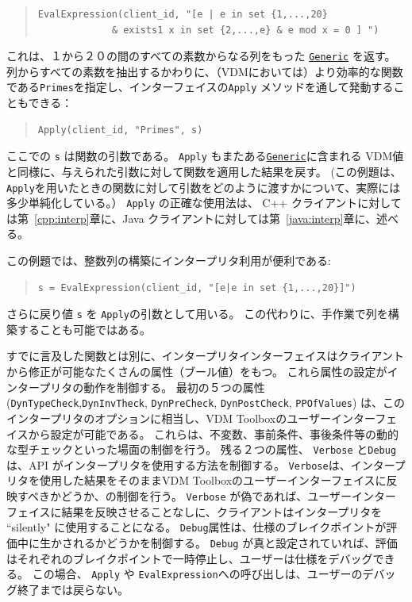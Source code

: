 \documentclass[\pformat,12pt]{jarticle}
\newcommand{\Generic}{\hyperlink{interface.Generic}{Generic}}
\begin{document}
\newpage
\begin{quote}
\begin{verbatim}    
EvalExpression(client_id, "[e | e in set {1,...,20} 
             & exists1 x in set {2,...,e} & e mod x = 0 ] ")
\end{verbatim}
\end{quote}

これは、１から２０の間のすべての素数からなる列をもった {\tt \Generic} を返す。列からすべての素数を抽出するかわりに、（VDMにおいては）より効率的な関数である{\tt Primes}を指定し、インターフェイスの{\tt Apply} メソッドを通して発動することもできる：

\begin{quote}
\begin{verbatim}    
Apply(client_id, "Primes", s)
\end{verbatim}
\end{quote}

ここでの {\tt s} は関数の引数である。
{\tt Apply} もまたある{\tt \Generic}に含まれる VDM値と同様に、与えられた引数に対して関数を適用した結果を戻す。
(この例題は、{\tt Apply}を用いたときの関数に対して引数をどのように渡すかについて、実際には多少単純化している。）
 {\tt Apply} の正確な使用法は、 C++ クライアントに対しては第~\ref{cpp:interp}章に、Java クライアントに対しては第~\ref{java:interp}章に、述べる。

この例題では、整数列の構築にインタープリタ利用が便利である:

\begin{quote}
\begin{verbatim}    
s = EvalExpression(client_id, "[e|e in set {1,...,20}]")
\end{verbatim}
\end{quote}

さらに戻り値 {\tt s} を {\tt  Apply}の引数として用いる。 
この代わりに、手作業で列を構築することも可能ではある。

すでに言及した関数とは別に、インタープリタインターフェイスはクライアントから修正が可能なたくさんの属性（ブール値）をもつ。
これら属性の設定がインタープリタの動作を制御する。
最初の５つの属性 ({\tt DynTypeCheck},{\tt DynInvTheck}, {\tt DynPreCheck}, {\tt DynPostCheck}, {\tt  PPOfValues}) は、このインタープリタのオプションに相当し、VDM Toolboxのユーザーインターフェイスから設定が可能である。
これらは、不変数、事前条件、事後条件等の動的な型チェックといった場面の制御を行う。
残る２つの属性、 {\tt Verbose} と{\tt Debug}は、API がインタープリタを使用する方法を制御する。
{\tt Verbose}は、インタープリタを使用した結果をそのままVDM Toolboxのユーザーインターフェイスに反映すべきかどうか、の制御を行う。
 {\tt Verbose} が偽であれば、ユーザーインターフェイスに結果を反映させることなしに、クライアントはインタープリタを ``silently" に使用することになる。
 {\tt Debug}属性は、仕様のブレイクポイントが評価中に生かされるかどうかを制御する。
 {\tt Debug} が真と設定されていれば、評価はそれぞれのブレイクポイントで一時停止し、ユーザーは仕様をデバッグできる。
この場合、 {\tt Apply} や {\tt  EvalExpression}への呼び出しは、ユーザーのデバッグ終了までは戻らない。
\end{document}
